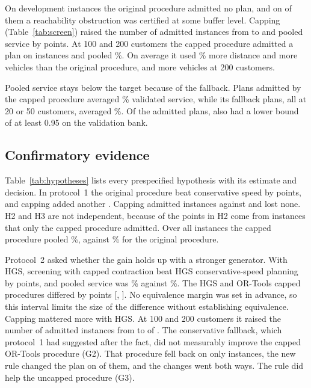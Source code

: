 \documentclass{itor}
\begin{document}
On \FailureCount{} development instances the original procedure admitted no
plan, and on \CertifiedFailures{} of them a reachability obstruction was
certified at some buffer level. Capping (Table~\ref{tab:screen}) raised the
number of admitted instances from \OriginalSelected{} to \CappedSelected{} and
pooled service by \CappedGainInterval{} points. At 100 and 200 customers the
capped procedure admitted a plan on \CappedLargeSelected{} instances and pooled
\CappedLargeRange\%. On average it used \CappedDistanceCost\% more distance and
\CappedFleetCost{} more vehicles than the original procedure, and
\CappedFleetLarge{} more vehicles at 200 customers.



Pooled service stays below the target because of the fallback. Plans admitted
by the capped procedure averaged \CappedSelectedMean\% validated service, while
its \CappedFallbackCount{} fallback plans, all at 20 or 50 customers, averaged
\CappedFallbackMean\%. Of the \CappedSelected{} admitted plans,
\CappedRetained{} also had a lower bound of at least 0.95 on the validation
bank.

\subsection{Confirmatory evidence}

Table~\ref{tab:hypotheses} lists every prespecified hypothesis with its estimate
and decision. In protocol~1 the original procedure beat conservative speed by
\ConfHOneMean{} points, and capping added another \ConfHTwoMean{}. Capping
admitted \ConfHThreeK{} instances against \ConfHThreeP{} and lost none. H2 and
H3 are not independent, because \HTwoFromKonly{} of the \ConfHTwoMean{} points
in H2 come from instances that only the capped procedure admitted. Over all
instances the capped procedure pooled \ConfPooledK\%, against \ConfPooledP\% for
the original procedure.



Protocol~2 asked whether the gain holds up with a stronger generator. With HGS,
screening with capped contraction beat HGS conservative-speed planning by
\CtwoGOneMean{} points, and pooled service was \CtwoPooledHGSK\% against
\CtwoPooledHGSCons\%. The HGS and OR-Tools capped procedures differed by
\CtwoGFourMean{} points [\CtwoGFourLo, \CtwoGFourHi]. No equivalence margin was set in advance, so this
interval limits the size of the difference without establishing equivalence.
Capping mattered more with HGS. At 100 and 200 customers it raised the number of
admitted instances from \CtwoHGSPAdmittedLarge{} to \CtwoHGSKAdmittedLarge{} of
\CtwoLarge{}. The conservative fallback, which protocol~1 had suggested after
the fact, did not measurably improve the capped OR-Tools procedure (G2). That
procedure fell back on only \CtwoORTKFallbacks{} instances, the new rule changed
the plan on \CtwoFallbacksChanged{} of them, and the changes went both ways. The
rule did help the uncapped procedure (G3).
\end{document}
